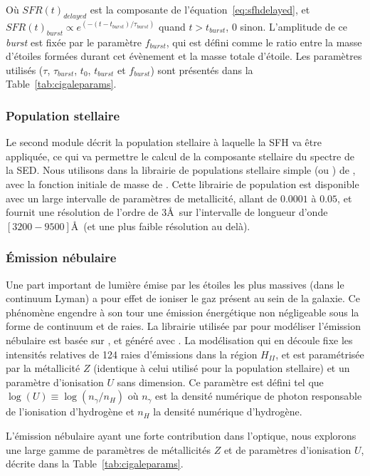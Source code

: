 \documentclass[../main/main.tex]{subfiles}
\begin{document}
Où $SFR(t)_{delayed}$ est la composante de l'équation~\ref{eq:sfhdelayed}, et $SFR(t)_{burst}\propto e^{(-(t-t_{burst})/\tau_{burst})}$ quand $t>t_{burst}$, $0$ sinon. L'amplitude de ce \textit{burst} est fixée par le paramètre $f_{burst}$, qui est défini comme le ratio entre la masse d'étoiles formées durant cet évènement et la masse totale d'étoile. Les paramètres utilisés ($\tau$, $\tau_{burst}$, $t_0$, $t_{burst}$ et $f_{burst}$) sont présentés dans la Table~\ref{tab:cigaleparams}.

\subsubsection{Population stellaire}
Le second module décrit la population stellaire à laquelle la SFH va être appliquée, ce qui va permettre le calcul de la composante stellaire du spectre de la SED. Nous utilisons dans \hypergal la librairie de populations stellaire simple \textbf{} (ou ) de \citet{BCO3}, avec la fonction initiale de masse de \citet{Chabrier2003}. Cette librairie de population est disponible avec un large intervalle de paramètres de metallicité, allant de $0.0001$ à $0.05$, et fournit une résolution de l'ordre de $3$\AA\ sur l'intervalle de longueur d'onde $[3200-9500]$\AA\ (et une plus faible résolution au delà).


\subsubsection{\'Emission nébulaire}

Une part important de lumière émise par les étoiles les plus massives (dans le continuum Lyman) a pour effet de ioniser le gaz présent au sein de la galaxie. Ce phénomène engendre à son tour une émission énergétique non négligeable sous la forme de continuum et de raies. La librairie utilisée par \cigale pour modéliser l'émission nébulaire est basée sur \citet{Inoue2011}, et généré avec  \citep{Ferland2013}.
La modélisation qui en découle fixe les intensités relatives de 124 raies d'émissions dans la région $H_{II}$, et est paramétrisée par la métallicité $Z$ (identique à celui utilisé pour la population stellaire) et un paramètre d'ionisation $U$ sans dimension. Ce paramètre est défini tel que $\log(U)\equiv \log(n_{\gamma}/n_H)$ où $n_{\gamma}$ est la densité numérique de photon responsable de l'ionisation d'hydrogène et $n_H$ la densité numérique d'hydrogène.

L'émission nébulaire ayant une forte contribution dans l'optique, nous explorons une large gamme de paramètres de métallicités $Z$ et de paramètres d'ionisation $U$, décrite dans la Table~\ref{tab:cigaleparams}.
\end{document}
